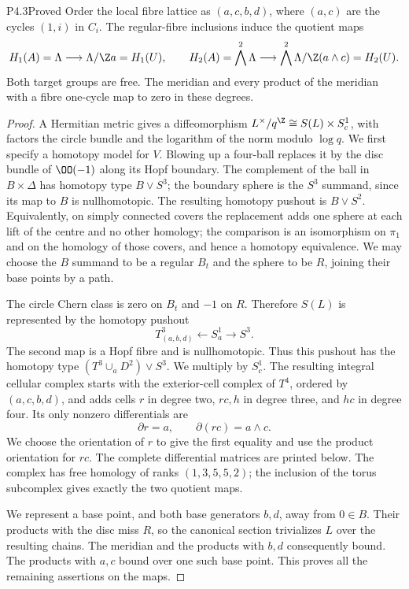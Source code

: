 \begin{statement}{P4.3}{Proved}
Order the local fibre lattice as $(a,c,b,d)$, where $(a,c)$ are the cycles
$(1,i)$ in $C_i$. The regular-fibre inclusions induce the quotient maps
\[
 H_1(A)=\Lambda\longrightarrow\Lambda/\Z a=H_1(U),\qquad
 H_2(A)=\bigwedge^2\Lambda\longrightarrow
 \bigwedge^2\Lambda/\Z(a\wedge c)=H_2(U).
\]
Both target groups are free. The meridian and every product of the
meridian with a fibre one-cycle map to zero in these degrees.
\end{statement}
\begin{proof}
A Hermitian metric gives a diffeomorphism
$L^\times/q^\Z\cong S(L)\times S^1_c$, with factors the circle bundle and
the logarithm of the norm modulo $\log q$. We first specify a homotopy
model for $V$. Blowing up a four-ball replaces it by the disc bundle of
$\OO(-1)$ along its Hopf boundary. The complement of the ball in
$B\times\Delta$ has homotopy type $B\vee S^3$; the boundary sphere is
the $S^3$ summand, since its map to $B$ is nullhomotopic. The resulting
homotopy pushout is $B\vee S^2$. Equivalently, on simply connected
covers the replacement adds one sphere at each lift of the centre and
no other homology; the comparison is an isomorphism on $\pi_1$ and on
the homology of those covers, and hence a homotopy equivalence. We may
choose the $B$ summand to be a regular $B_t$ and the sphere to be $R$,
joining their base points by a path.

The circle Chern class is zero on $B_t$ and $-1$ on $R$. Therefore
$S(L)$ is represented by the homotopy pushout
\[
 T^3_{(a,b,d)}\longleftarrow S^1_a\longrightarrow S^3.
\]
The second map is a Hopf fibre and is nullhomotopic. Thus this pushout
has the homotopy type $(T^3\cup_aD^2)\vee S^3$. We multiply by $S^1_c$.
The resulting integral cellular complex starts with the exterior-cell
complex of $T^4$, ordered by $(a,c,b,d)$, and adds cells $r$ in degree
two, $rc,h$ in degree three, and $hc$ in degree four. Its only nonzero
differentials are
\[
 \partial r=a,\qquad \partial(rc)=a\wedge c.
\]
We choose the orientation of $r$ to give the first equality and use the
product orientation for $rc$. The complete differential matrices are
printed below. The complex has free homology of ranks $(1,3,5,5,2)$;
the inclusion of the torus subcomplex gives exactly the two quotient maps.

We represent a base point, and both base generators $b,d$, away from
$0\in B$. Their products with the disc miss $R$, so the canonical section
trivializes $L$ over the resulting chains. The meridian and the products
with $b,d$ consequently bound. The products with $a,c$ bound over one
such base point. This proves all the remaining assertions on the maps.
\end{proof}


